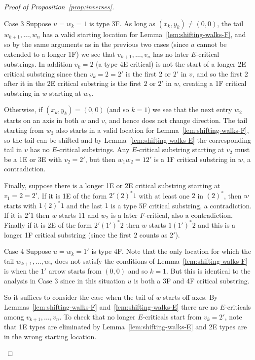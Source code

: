 \documentclass[ALCO,ThmDefs,Unicode,epreuves]{cedram}
\begin{document}
\begin{proof}[Proof of Proposition~\ref{prop:inverses}]
\begin{enonce*}[remark]{Case 3} Suppose $u=w_k=1$ is type 3F. As long as $(x_k,y_k)\neq (0,0)$, the tail $w_{k+1},\ldots, w_{n}$ has a valid starting location for Lemma~\ref{lem:shifting-walks-F}, and so by the same arguments as in the previous two cases (since $u$ cannot be extended to a longer 1F) we see that $v_{k+1},\ldots,v_n$ has no later $E$-critical substrings. In addition $v_k=2$ (a type 4E critical) is not the start of a longer 2E critical substring since then $v_k=2=2'$ is the first $2$ or $2'$ in $v$, and so the first $2$ after it in the 2E critical substring is the first $2$ or $2'$ in $w$, creating a 1F critical substring in $w$ starting at $w_k$.

Otherwise, if $(x_k,y_k)=(0,0)$ (and so $k=1$) we see that the next entry $w_2$ starts on an axis in both $w$ and $v$, and hence does not change direction. The tail starting from $w_3$ also starts in a valid location for Lemma~\ref{lem:shifting-walks-F}, so the tail can be shifted and by Lemma~\ref{lem:shifting-walks-E} the corresponding tail in $v$ has no $E$-critical substrings. Any $E$-critical substring starting at $v_2$ must be a 1E or 3E with $v_2=2'$, but then $w_1w_2=12'$ is a 1F critical substring in $w$, a contradiction. 

Finally, suppose there is a longer 1E or 2E critical substring starting at $v_1=2=2'$. If it is 1E of the form $2'(2)^\ast 1$ with at least one $2$ in $(2)^\ast$, then $w$ starts with $1(2)^\ast 1$ and the last $1$ is a type 5F critical substring, a contradiction. If it is $2'1$ then $w$ starts $11$ and $w_2$ is a later $F$-critical, also a contradiction. Finally if it is 2E of the form $2'(1')^\ast 2$ then $w$ starts $1(1')^\ast 2$ and this is a longer 1F critical substring (since the first $2$ counts as $2'$).
\end{enonce*}

\begin{enonce*}[remark]{Case 4} Suppose $u=w_k=1'$ is type 4F. Note that the only location for which the tail $w_{k+1},\ldots,w_{n}$ does not satisfy the conditions of Lemma~\ref{lem:shifting-walks-F} is when the $1'$ arrow starts from $(0,0)$ and so $k=1$. But this is identical to the analysis in Case 3 since in this situation $u$ is both a 3F and 4F critical substring.

So it suffices to consider the case when the tail of $w$ starts off-axes. By Lemmas~\ref{lem:shifting-walks-F} and~\ref{lem:shifting-walks-E} there are no $E$-criticals among $v_{k+1},\ldots,v_n$. To check that no longer $E$-criticals start from $v_k=2'$, note that 1E types are eliminated by Lemma~\ref{lem:shifting-walks-E} and 2E types are in the wrong starting location.\qedhere
\end{enonce*}
\end{proof}
\end{document}
